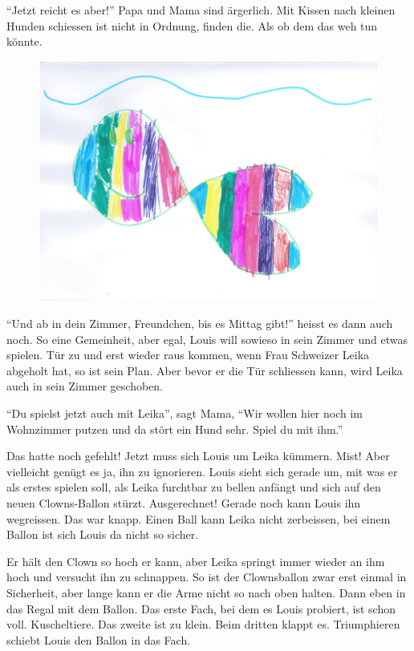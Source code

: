 \enquote{Jetzt reicht es aber!} Papa und Mama sind ärgerlich. Mit Kissen nach kleinen Hunden schiessen ist nicht in Ordnung, finden die. Als ob dem das weh tun könnte.
\begin{figure}[ht]
\centering
\includegraphics[width=\textwidth]{bilder/clown.pdf}
\end{figure}
\enquote{Und ab in dein Zimmer, Freundchen, bis es Mittag gibt!} heisst es dann auch noch. So eine Gemeinheit, aber egal, Louis will sowieso in sein Zimmer und etwas spielen. Tür zu und erst wieder raus kommen, wenn Frau Schweizer Leika abgeholt hat, so ist sein Plan. Aber bevor er die Tür schliessen kann, wird Leika auch in sein Zimmer geschoben. 

\enquote{Du spielst jetzt auch mit Leika}, sagt Mama, \enquote{Wir wollen hier noch im Wohnzimmer putzen und da stört ein Hund sehr. Spiel du mit ihm.}

Das hatte noch gefehlt! Jetzt muss sich Louis um Leika kümmern. Mist! Aber vielleicht genügt es ja, ihn zu ignorieren. Louis sieht sich gerade um, mit was er als erstes spielen soll, als Leika furchtbar zu bellen anfängt und sich auf den neuen Clowns-Ballon stürzt. Ausgerechnet! Gerade noch kann Louis ihn wegreissen. Das war knapp. Einen Ball kann Leika nicht zerbeissen, bei einem Ballon ist sich Louis da nicht so sicher.

Er hält den Clown so hoch er kann, aber Leika springt immer wieder an ihm hoch und versucht ihn zu schnappen. So ist der Clownsballon zwar erst einmal in Sicherheit, aber lange kann er die Arme nicht so nach oben halten. Dann eben in das Regal mit dem Ballon. Das erste Fach, bei dem es Louis probiert, ist schon voll. Kuscheltiere. Das zweite ist zu klein. Beim dritten klappt es. Triumphieren schiebt Louis den Ballon in das Fach.

